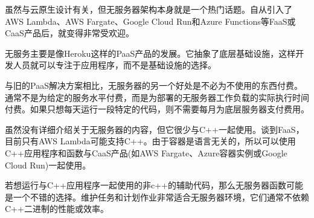 虽然与云原生设计有关，但无服务器架构本身就是一个热门话题。自从引入了AWS Lambda、AWS Fargate、Google Cloud Run和Azure Functions等FaaS或CaaS产品后，就变得非常受欢迎。

无服务主要是像Heroku这样的PaaS产品的发展。它抽象了底层基础设施，这样开发人员就可以专注于应用程序，而不是基础设施的选择。

与旧的PaaS解决方案相比，无服务器的另一个好处是不必为不使用的东西付费。通常不是为给定的服务水平付费，而是为部署的无服务器工作负载的实际执行时间付费。如果只想每天运行一段特定的代码，则不需要每月为底层服务器支付费用。

虽然没有详细介绍关于无服务器的内容，但它很少与C++一起使用。谈到FaaS，目前只有AWS Lambda可能支持C++。由于容器是语言无关的，所以可以使用C++应用程序和函数与CaaS产品(如AWS Fargate、Azure容器实例或Google Cloud Run)一起使用。

若想运行与C++应用程序一起使用的非c++的辅助代码，那么无服务器函数可能是一个不错的选择。维护任务和计划作业非常适合无服务器环境，它们通常不依赖C++二进制的性能或效率。



